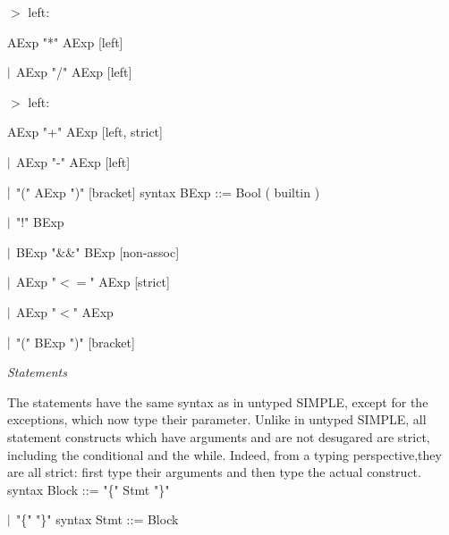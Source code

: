 \documentclass{article}
\begin{document}
\hspace{35pt} \qquad $>$ left: 

\hspace{35pt} \qquad  AExp 
"*" AExp 
[left]

 
\hspace{35pt} \qquad $\arrowvert$  AExp 
"/" AExp 
[left]

\hspace{35pt} \qquad $>$ left: 

\hspace{35pt} \qquad  AExp 
"+" AExp 
[left, strict]

 
\hspace{35pt} \qquad $\arrowvert$  AExp 
"-" AExp 
[left]

 
\hspace{35pt} \qquad $\arrowvert$ 
"(" AExp ")"
[bracket]
\newline
syntax BExp ::=  Bool  (  builtin ) 


 
\hspace{35pt} \qquad $\arrowvert$ "!" BExp 

 
\hspace{35pt} \qquad $\arrowvert$  BExp 
 "\&\&"  BExp 
[non-assoc]

 
\hspace{35pt} \qquad $\arrowvert$  AExp 
 "$<=$"  AExp 
[strict]

 
\hspace{35pt} \qquad $\arrowvert$  AExp 
 "$<$"  AExp 

 
\hspace{35pt} \qquad $\arrowvert$ 
"(" BExp ")"
[bracket]
\newline

\textit{Statements}
\newline

 \qquad The statements have the same syntax as in untyped SIMPLE, except for the exceptions, which now type their parameter.  Unlike in untyped SIMPLE, all statement constructs which have arguments and are not desugared are strict, including the conditional and the while. Indeed, from a typing perspective,they are all strict: first type their arguments and then type the actual construct.\newline\newline
syntax Block ::=  "\{"  Stmt 
 "\}" 

 
\hspace{35pt} \qquad $\arrowvert$ 
 "\{" 
 "\}" 
\newline
syntax Stmt ::=  Block 
 
\end{document}
